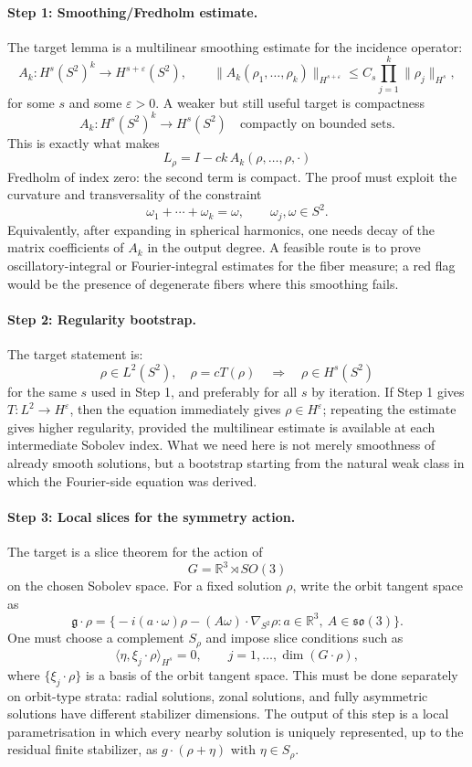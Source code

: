 \documentclass[12pt]{article}
\begin{document}
\paragraph{Step 1: Smoothing/Fredholm estimate.}
The target lemma is a multilinear smoothing estimate for the incidence operator:
\[
  A_k:H^s(S^2)^k\longrightarrow H^{s+\varepsilon}(S^2),
  \qquad
  \|A_k(\rho_1,\ldots,\rho_k)\|_{H^{s+\varepsilon}}
  \leq C_s\prod_{j=1}^k\|\rho_j\|_{H^s},
\]
for some $s$ and some $\varepsilon>0$. A weaker but still useful target is
compactness
\[
  A_k:H^s(S^2)^k\longrightarrow H^s(S^2)
  \quad\text{compactly on bounded sets.}
\]
This is exactly what makes
\[
  L_\rho=I-ck\,A_k(\rho,\ldots,\rho,\cdot)
\]
Fredholm of index zero: the second term is compact. The proof must exploit
the curvature and transversality of the constraint
\[
  \omega_1+\cdots+\omega_k=\omega,\qquad \omega_j,\omega\in S^2.
\]
Equivalently, after expanding in spherical harmonics, one needs decay of the
matrix coefficients of $A_k$ in the output degree. A feasible route is to prove
oscillatory-integral or Fourier-integral estimates for the fiber measure; a
red flag would be the presence of degenerate fibers where this smoothing fails.

\paragraph{Step 2: Regularity bootstrap.}
The target statement is:
\[
  \rho\in L^2(S^2),\quad \rho=cT(\rho)
  \quad\Longrightarrow\quad
  \rho\in H^s(S^2)
\]
for the same $s$ used in Step 1, and preferably for all $s$ by iteration.
If Step 1 gives $T:L^2\to H^\varepsilon$, then the equation immediately gives
$\rho\in H^\varepsilon$; repeating the estimate gives higher regularity,
provided the multilinear estimate is available at each intermediate Sobolev
index. What we need here is not merely smoothness of already smooth solutions,
but a bootstrap starting from the natural weak class in which the Fourier-side
equation was derived.

\paragraph{Step 3: Local slices for the symmetry action.}
The target is a slice theorem for the action of
\[
  G=\mathbb{R}^3\rtimes SO(3)
\]
on the chosen Sobolev space. For a fixed solution $\rho$, write the orbit
tangent space as
\[
  \mathfrak g\cdot\rho
  =
  \bigl\{
    -i(a\cdot\omega)\rho - (A\omega)\cdot\nabla_{S^2}\rho
    : a\in\mathbb{R}^3,\ A\in\mathfrak{so}(3)
  \bigr\}.
\]
One must choose a complement $S_\rho$ and impose slice conditions such as
\[
  \langle \eta,\xi_j\cdot\rho\rangle_{H^s}=0,
  \qquad j=1,\ldots,\dim(G\cdot\rho),
\]
where $\{\xi_j\cdot\rho\}$ is a basis of the orbit tangent space. This must be
done separately on orbit-type strata: radial solutions, zonal solutions, and
fully asymmetric solutions have different stabilizer dimensions. The output of
this step is a local parametrisation in which every nearby solution is uniquely
represented, up to the residual finite stabilizer, as $g\cdot(\rho+\eta)$ with
$\eta\in S_\rho$.
\end{document}
